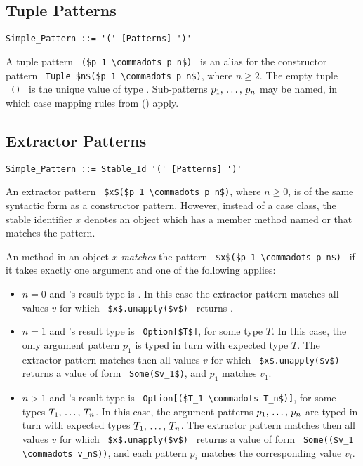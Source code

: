 \subsection{Tuple Patterns}
\label{sec:tuple-patterns}

\syntax\begin{lstlisting}
Simple_Pattern ::= '(' [Patterns] ')'
\end{lstlisting}

A tuple pattern ~\lstinline!($p_1 \commadots p_n$)!~ is an alias for the constructor pattern ~\lstinline!Tuple_$n$($p_1 \commadots p_n$)!, where $n \geq 2$. The empty tuple ~\lstinline!()!~ is the unique value of type . Sub-patterns $p_1 ,\, \ldots ,\, p_n$ may be named, in which case mapping rules from () apply. 





\subsection{Extractor Patterns}
\label{sec:extractor-patterns}

\syntax\begin{lstlisting}
Simple_Pattern ::= Stable_Id '(' [Patterns] ')'
\end{lstlisting}

An extractor pattern ~\lstinline!$x$($p_1 \commadots p_n$)!, where $n \geq 0$, is of the same syntactic form as a constructor pattern. However, instead of a case class, the stable identifier $x$ denotes an object which has a member method named  or  that matches the pattern. 

An  method in an object $x$ {\em matches} the pattern ~\lstinline!$x$($p_1 \commadots p_n$)!~ if it takes exactly one argument and one of the following applies: 

\begin{itemize}
  \item[] $n = 0$ and 's result type is . In this case the extractor pattern matches all values $v$ for which ~\lstinline!$x$.unapply($v$)!~ returns . 
  
  \item[] $n = 1$ and 's result type is ~\lstinline!Option[$T$]!, for some type $T$. In this case, the only argument pattern $p_1$ is typed in turn with expected type $T$. The extractor pattern matches then all values $v$ for which ~\lstinline!$x$.unapply($v$)!~ returns a value of form ~\lstinline!Some($v_1$)!, and $p_1$ matches $v_1$. 

  \item[] $n > 1$ and 's result type is ~\lstinline!Option[($T_1 \commadots T_n$)]!, for some types $T_1 ,\, \ldots ,\, T_n$. In this case, the argument patterns $p_1 ,\, \ldots ,\, p_n$ are typed in turn with expected types $T_1 ,\, \ldots ,\, T_n$. The extractor pattern matches then all values $v$ for which ~\lstinline!$x$.unapply($v$)!~ returns a value of form ~\lstinline!Some(($v_1 \commadots v_n$))!, and each pattern $p_i$ matches the corresponding value $v_i$.
  
\end{itemize}

